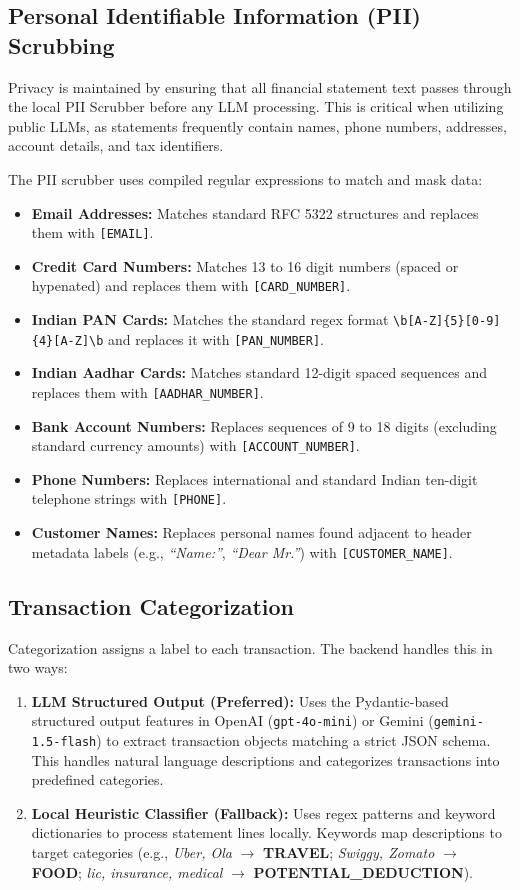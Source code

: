 \documentclass[11pt,a4paper]{article}
\begin{document}
\subsection{Personal Identifiable Information (PII) Scrubbing}
Privacy is maintained by ensuring that all financial statement text passes through the local PII Scrubber before any LLM processing. This is critical when utilizing public LLMs, as statements frequently contain names, phone numbers, addresses, account details, and tax identifiers.

The PII scrubber uses compiled regular expressions to match and mask data:
\begin{itemize}
    \item \textbf{Email Addresses:} Matches standard RFC 5322 structures and replaces them with \texttt{[EMAIL]}.
    \item \textbf{Credit Card Numbers:} Matches 13 to 16 digit numbers (spaced or hypenated) and replaces them with \texttt{[CARD\_NUMBER]}.
    \item \textbf{Indian PAN Cards:} Matches the standard regex format \texttt{\textbackslash b[A-Z]\{5\}[0-9]\{4\}[A-Z]\textbackslash b} and replaces it with \texttt{[PAN\_NUMBER]}.
    \item \textbf{Indian Aadhar Cards:} Matches standard 12-digit spaced sequences and replaces them with \texttt{[AADHAR\_NUMBER]}.
    \item \textbf{Bank Account Numbers:} Replaces sequences of 9 to 18 digits (excluding standard currency amounts) with \texttt{[ACCOUNT\_NUMBER]}.
    \item \textbf{Phone Numbers:} Replaces international and standard Indian ten-digit telephone strings with \texttt{[PHONE]}.
    \item \textbf{Customer Names:} Replaces personal names found adjacent to header metadata labels (e.g., \textit{``Name:''}, \textit{``Dear Mr.''}) with \texttt{[CUSTOMER\_NAME]}.
\end{itemize}

\subsection{Transaction Categorization}
Categorization assigns a label to each transaction. The backend handles this in two ways:
\begin{enumerate}
    \item \textbf{LLM Structured Output (Preferred):} Uses the Pydantic-based structured output features in OpenAI (\texttt{gpt-4o-mini}) or Gemini (\texttt{gemini-1.5-flash}) to extract transaction objects matching a strict JSON schema. This handles natural language descriptions and categorizes transactions into predefined categories.
    \item \textbf{Local Heuristic Classifier (Fallback):} Uses regex patterns and keyword dictionaries to process statement lines locally. Keywords map descriptions to target categories (e.g., \textit{Uber, Ola} $\rightarrow$ \textbf{TRAVEL}; \textit{Swiggy, Zomato} $\rightarrow$ \textbf{FOOD}; \textit{lic, insurance, medical} $\rightarrow$ \textbf{POTENTIAL\_DEDUCTION}).
\end{enumerate}
\end{document}
